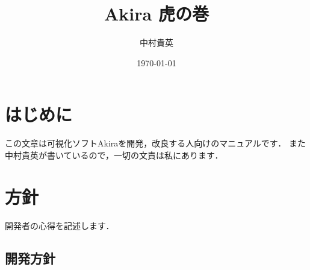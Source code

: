\documentclass[a4j,openany]{jbook}
\title{{\Huge \textbf{Akira 虎の巻}}\\ }
\author{中村貴英}
\date{\today}
\begin{document}
\maketitle
\frontmatter
\chapter{はじめに}
この文章は可視化ソフトAkiraを開発，改良する人向けのマニュアルです．
また中村貴英が書いているので，一切の文責は私にあります．

\tableofcontents
\mainmatter


\chapter{方針}
開発者の心得を記述します．
 \section{開発方針}
\end{document}
